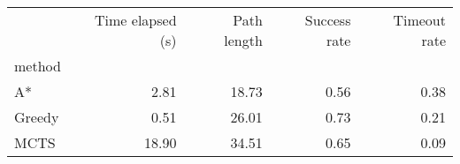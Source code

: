 \begin{tabular}{lrrrr}
\toprule
 & Time elapsed (s) & Path length & Success rate & Timeout rate \\
method &  &  &  &  \\
\midrule
A* & 2.81 & 18.73 & 0.56 & 0.38 \\
Greedy & 0.51 & 26.01 & 0.73 & 0.21 \\
MCTS & 18.90 & 34.51 & 0.65 & 0.09 \\
\bottomrule
\end{tabular}
